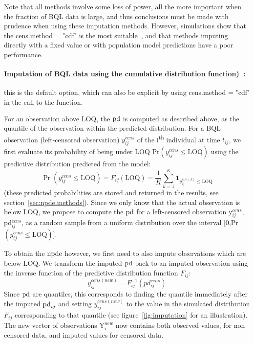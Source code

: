 Note that all methods involve some loss of power, all the more important when the fraction of BQL data is large, 
and thus conclusions must be made with prudence when using these imputation methods. However, simulations show that 
the {\sf cens.method = "cdf"} is the most suitable~\cite{Nguyen2012}, and that methods imputing directly with a 
fixed value or with population model predictions have a poor performance.


\paragraph{Imputation of BQL data using the cumulative distribution function)~\cite{Nguyen2012}:} this is the 
default option, which can also be explicit by using {\sf cens.method = "cdf"} in the call to the function.

For an observation above LOQ, the ${\rm pd}$ is computed as described above, as the quantile of the observation within 
the predicted distribution. For a BQL observation (left-censored observation) $y^{cens}_{ij}$ of the 
i\textsuperscript{th} individual at time $t_{ij}$, we first evaluate its probability of being under LOQ 
Pr$(y_{ij}^{cens}\leq\mbox{LOQ})$ using the predictive distribution predicted from the model: 
\begin{equation} 
\Pr(y_{ij}^{cens}\leq\mbox{LOQ})=F_{ij}(\mbox{LOQ})=\frac{1}{K}{\textstyle 
\overset{K}{\underset{k=1}{\sum}}\boldsymbol{1}_{y_{ij}^{sim(k)}\leq\mbox{LOQ}}} 
\end{equation} 
(these predicted probabilities are stored and returned in the results, see section~\ref{sec:npde.methods}). Since 
we only know that the actual observation is below LOQ, we propose to compute the ${\rm pd}$ for a left-censored 
observation y$_{ij}^{cens}$, pd$_{ij}^{cens}$, as a random sample from a uniform distribution over the interval 
[0,Pr$(y_{ij}^{cens}\leq\mbox{LOQ})]$.

To obtain the ${\rm npde}$ however, we first need to also impute observations which are below LOQ. We transform the 
imputed ${\rm pd}$ back to an imputed observation using the inverse function of the predictive distribution function 
$F_{ij}$: \begin{equation} y_{ij}^{cens(new)}=F_{ij}^{-1}(pd_{ij}^{cens}) \end{equation} Since ${\rm pd}$ are quantiles, 
this corresponds to finding the quantile immediately after the imputed ${\rm pd}_{ij}$ and setting $y_{ij}^{cens(new)}$ 
to the value in the simulated distribution $F_{ij}$ corresponding to that quantile (see figure~\ref{fig:imputation} 
for an illustration). The new vector of observations Y$_{i}^{new}$ now contains both observed values, for non 
censored data, and imputed values for censored data. 

